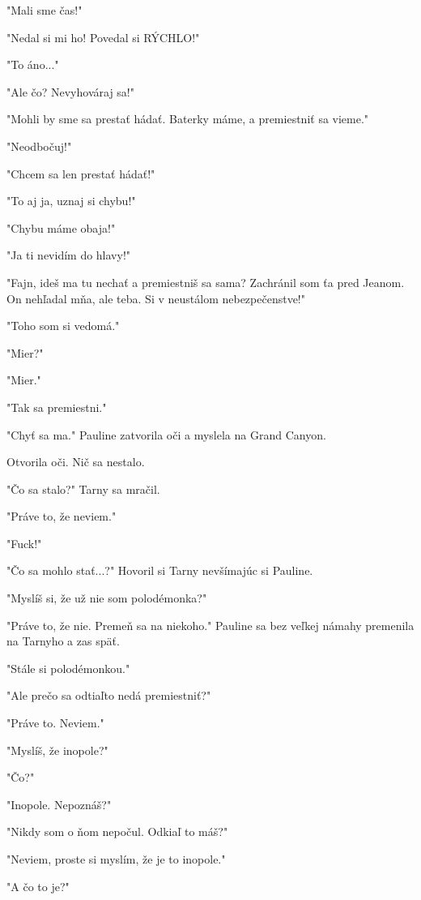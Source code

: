 \documentclass{book}
\begin{document}
"$ $Mali sme čas!"$ $ 

"$ $Nedal si mi ho! Povedal si RÝCHLO!"$ $ 

"$ $To áno..."$ $ 

"$ $Ale čo? Nevyhováraj sa!"$ $ 

"$ $Mohli by sme sa prestať hádať. Baterky máme, a premiestniť sa vieme."$ $ 

"$ $Neodbočuj!"$ $ 

"$ $Chcem sa len prestať hádať!"$ $ 

"$ $To aj ja, uznaj si chybu!"$ $ 

"$ $Chybu máme obaja!"$ $ 

"$ $Ja ti nevidím do hlavy!"$ $ 

"$ $Fajn, ideš ma tu nechať a premiestniš sa sama? Zachránil som ťa pred Jeanom. On nehľadal mňa, ale teba. Si v neustálom nebezpečenstve!"$ $ 

"$ $Toho som si vedomá."$ $ 

"$ $Mier?"$ $ 

"$ $Mier."$ $ 

"$ $Tak sa premiestni."$ $ 

"$ $Chyť sa ma."$ $  Pauline zatvorila oči a myslela na Grand Canyon.

Otvorila oči. Nič sa nestalo.

"$ $Čo sa stalo?"$ $  Tarny sa mračil.

"$ $Práve to, že neviem."$ $ 

"$ $Fuck!"$ $ 

"$ $Čo sa mohlo stať...?"$ $  Hovoril si Tarny nevšímajúc si Pauline.

"$ $Myslíš si, že už nie som polodémonka?"$ $ 

"$ $Práve to, že nie. Premeň sa na niekoho."$ $  Pauline sa bez veľkej námahy premenila na Tarnyho a zas späť.

"$ $Stále si polodémonkou."$ $ 

"$ $Ale prečo sa odtiaľto nedá premiestniť?"$ $ 

"$ $Práve to. Neviem."$ $ 

"$ $Myslíš, že inopole?"$ $ 

"$ $Čo?"$ $ 

"$ $Inopole. Nepoznáš?"$ $ 

"$ $Nikdy som o ňom nepočul. Odkiaľ to máš?"$ $ 

"$ $Neviem, proste si myslím, že je to inopole."$ $ 

"$ $A čo to je?"$ $ 
\end{document}
